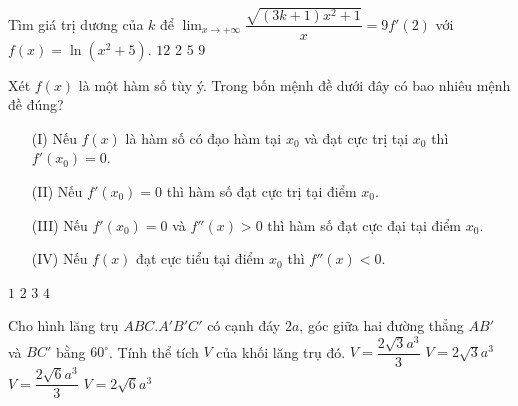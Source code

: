 \begin{ex}%
Tìm giá trị dương của $k$ để $\displaystyle \lim_{x \to +\infty} \dfrac{\sqrt{(3k+1)x^2+1}}{x}=9f'(2)$ với $f(x)=\ln(x^2+5)$.
\choice
{$12$}
{$2$}
{\True $5$}
{$9$}
\end{ex}

\begin{ex}%
Xét $f(x)$ là một hàm số tùy ý. Trong bốn mệnh đề dưới đây có bao nhiêu mệnh đề đúng? 
\begin{enumerate}
\item[(I)] Nếu $f(x)$ là hàm số có đạo hàm tại $x_0$ và đạt  cực trị tại $x_0$ thì $f'(x_0) =0$.
\item[(II)] Nếu $f'(x_0)=0$ thì hàm số  đạt  cực trị tại điểm $x_0$. 
\item[(III)] Nếu $f'(x_0)=0$  và $f''(x)>0$ thì hàm số  đạt cực đại tại điểm $x_0$. 
\item[(IV)] Nếu $f(x)$  đạt  cực tiểu tại điểm $x_0$ thì $f''(x)<0$. 
\end{enumerate}
\choice
{\True $1$}
{$2$}
{$3$}
{$4$}
\end{ex}

\begin{ex}%
Cho hình lăng trụ $ABC.A'B'C'$ có cạnh đáy $2a$, góc giữa hai đường thẳng $AB'$ và $BC'$ bằng $60^\circ$. Tính thể tích $V$ của khối lăng trụ đó.
\choice
{$V=\dfrac{2\sqrt{3}a^3}{3}$}
{$V=2\sqrt{3}a^3$}
{\True $V=\dfrac{2\sqrt{6}a^3}{3}$}
{$V=2\sqrt{6}a^3$}
\end{ex}

